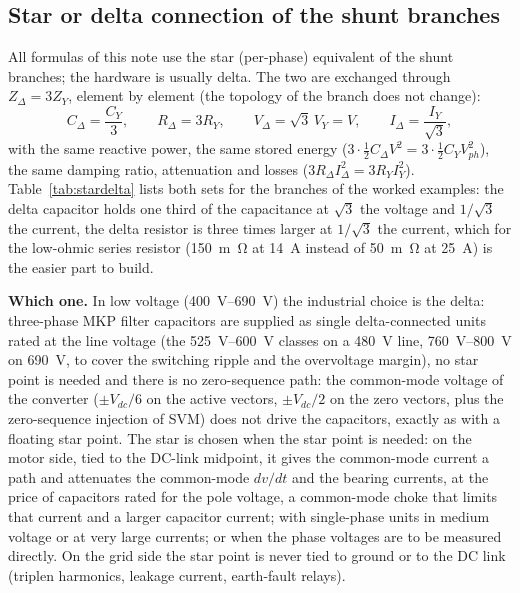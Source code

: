 \documentclass[10pt,a4paper]{scrartcl}
\newcommand{\Vdc}{V_{dc}}
\begin{document}
\begin{onehalfspace}
\subsection{Star or delta connection of the shunt branches}
\label{sec:stardelta}
All formulas of this note use the star (per-phase) equivalent of the shunt branches; the hardware is usually delta. The two are exchanged through $Z_\Delta = 3Z_Y$, element by element (the topology of the branch does not change):
\begin{equation}
C_\Delta = \frac{C_Y}{3},\qquad R_\Delta = 3R_Y,\qquad V_\Delta = \sqrt3\,V_Y = V,\qquad I_\Delta = \frac{I_Y}{\sqrt3},
\label{eq:stardelta}
\end{equation}
with the same reactive power, the same stored energy ($3\cdot\tfrac12 C_\Delta V^2 = 3\cdot\tfrac12 C_Y V_{ph}^2$), the same damping ratio, attenuation and losses ($3R_\Delta I_\Delta^2 = 3R_Y I_Y^2$). Table~\ref{tab:stardelta} lists both sets for the branches of the worked examples: the delta capacitor holds one third of the capacitance at $\sqrt3$ the voltage and $1/\sqrt3$ the current, the delta resistor is three times larger at $1/\sqrt3$ the current, which for the low-ohmic series resistor (\SI{150}{m\ohm} at \SI{14}{A} instead of \SI{50}{m\ohm} at \SI{25}{A}) is the easier part to build.

\textbf{Which one.} In low voltage (\SIrange{400}{690}{V}) the industrial choice is the delta: three-phase MKP filter capacitors are supplied as single delta-connected units rated at the line voltage (the \SIrange{525}{600}{V} classes on a \SI{480}{V} line, \SIrange{760}{800}{V} on \SI{690}{V}, to cover the switching ripple and the overvoltage margin), no star point is needed and there is no zero-sequence path: the common-mode voltage of the converter ($\pm\Vdc/6$ on the active vectors, $\pm\Vdc/2$ on the zero vectors, plus the zero-sequence injection of SVM) does not drive the capacitors, exactly as with a floating star point. The star is chosen when the star point is needed: on the motor side, tied to the DC-link midpoint, it gives the common-mode current a path and attenuates the common-mode $dv/dt$ and the bearing currents, at the price of capacitors rated for the pole voltage, a common-mode choke that limits that current and a larger capacitor current; with single-phase units in medium voltage or at very large currents; or when the phase voltages are to be measured directly. On the grid side the star point is never tied to ground or to the DC link (triplen harmonics, leakage current, earth-fault relays).


\end{onehalfspace}
\end{document}
